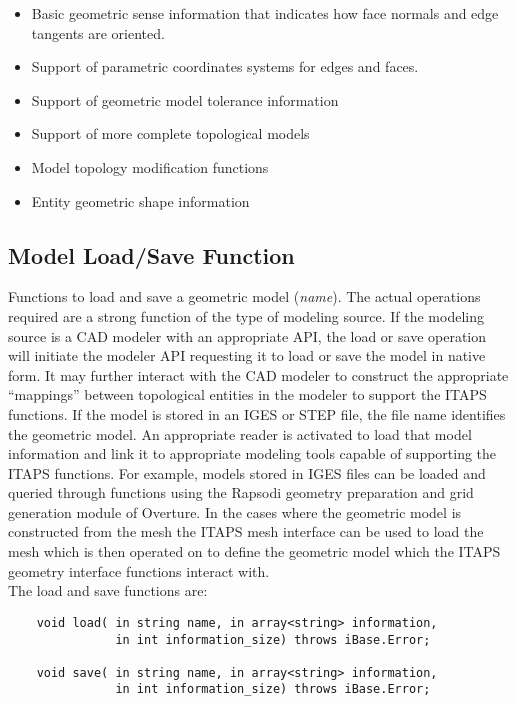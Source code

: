 \documentclass{article}
\begin{document}
\begin{itemize}
\item Basic geometric sense information that indicates 
how face normals and edge tangents are oriented. 
\item Support of parametric coordinates systems for 
edges and faces. 
\item Support of geometric model tolerance information
\item Support of more complete topological models
\item Model topology modification functions
\item Entity geometric shape information
\end{itemize}

\subsection{Model Load/Save Function}
Functions to load and save a geometric model (\textit{name}). 
The actual operations required are a strong function of the type 
of modeling source. If the modeling source is a CAD modeler with 
an appropriate API, the load or save operation will initiate 
the modeler API requesting it to load or save the model in native 
form. It may further interact with the CAD modeler to construct 
the appropriate ``mappings'' between topological entities in the 
modeler to support the ITAPS functions. If the model is stored 
in an IGES or STEP file, the file name identifies the geometric 
model. An appropriate reader is activated to load that model 
information and link it to appropriate modeling tools capable 
of supporting the ITAPS functions. For example, models stored 
in IGES files can be loaded and queried through functions using 
the Rapsodi geometry preparation and grid generation module of 
Overture. In the cases where the geometric model is constructed 
from the mesh the ITAPS mesh interface can be used to load the 
mesh which is then operated on to define the geometric model 
which the ITAPS geometry interface functions interact with.\\


\hspace{-16pt}The load and save functions are:

\begin{verbatim}
    void load( in string name, in array<string> information,
               in int information_size) throws iBase.Error;

    void save( in string name, in array<string> information,
               in int information_size) throws iBase.Error;
\end{verbatim}		   
\end{document}
